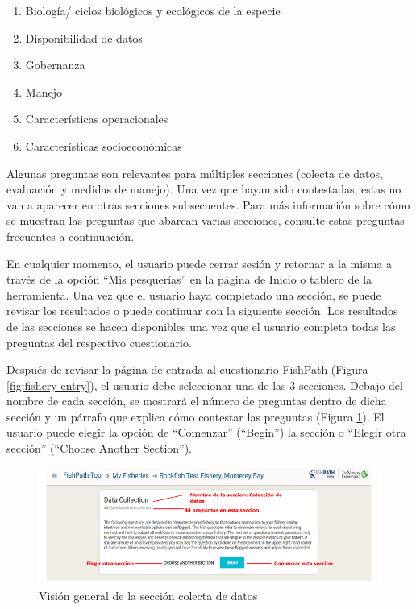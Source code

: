 \documentclass[
  11pt,
]{book}
\providecommand{\tightlist}{%
  \setlength{\itemsep}{0pt}\setlength{\parskip}{0pt}}
\begin{document}
\begin{enumerate}
\def\labelenumi{\arabic{enumi}.}
\tightlist
\item
  Biología/ ciclos biológicos y ecológicos de la especie
\item
  Disponibilidad de datos
\item
  Gobernanza
\item
  Manejo
\item
  Características operacionales
\item
  Características socioeconómicas
\end{enumerate}

Algunas preguntas son relevantes para múltiples secciones (colecta de datos, evaluación y medidas de manejo). Una vez que hayan sido contestadas, estas no van a aparecer en otras secciones subsecuentes. Para más información sobre cómo se muestran las preguntas que abarcan varias secciones, consulte estas \protect\hyperlink{faq-question-numbering}{preguntas frecuentes a continuación}.

En cualquier momento, el usuario puede cerrar sesión y retornar a la misma a través de la opción ``Mis pesquerías'' en la página de Inicio o tablero de la herramienta. Una vez que el usuario haya completado una sección, se puede revisar los resultados o puede continuar con la siguiente sección. Los resultados de las secciones se hacen disponibles una vez que el usuario completa todas las preguntas del respectivo cuestionario.

Después de revisar la página de entrada al cuestionario FishPath (Figura \ref{fig:fishery-entry}), el usuario debe seleccionar una de las 3 secciones. Debajo del nombre de cada sección, se mostrará el número de preguntas dentro de dicha sección y un párrafo que explica cómo contestar las preguntas (Figura \ref{fig:dc-overview}). El usuario puede elegir la opción de ``Comenzar'' (``Begin'') la sección o ``Elegir otra sección'' (``Choose Another Section'').

\begin{figure}

{\centering \includegraphics[width=0.95\linewidth]{images/dc-overview-es} 

}

\caption{Visión general de la sección colecta de datos}\label{fig:dc-overview}
\end{figure}
\end{document}
